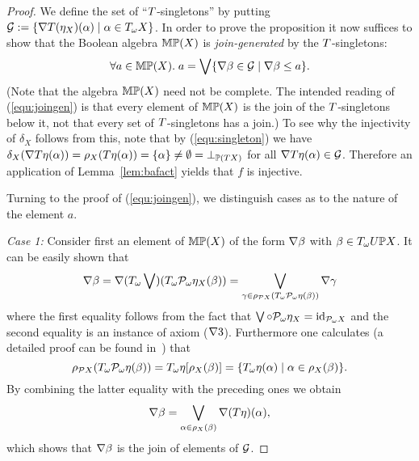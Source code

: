 \documentclass{book}
\begin{document}
\begin{proof}
We define the set of ``$T$-singletons'' by putting
$\mathcal{G} \mathrel{:=} \{ \nabla T(\eta_X)(\alpha)
\mid \alpha \in T_{\omega} X\}$.
In order to prove the proposition it now suffices to show that the Boolean 
algebra $\mathbb{M}\mathbb{P}(X)$ is \emph{join-generated} by the $T$-singletons: 
\begin{equation}
\label{equ:joingen}
\forall a \in \mathbb{M}\mathbb{P}(X). 
\; a = \bigvee \{\nabla \beta \in \mathcal{G} \mid \nabla \beta \leq a\}.
\end{equation}
(Note that the algebra $\mathbb{M}\mathbb{P}(X)$ need not be complete.  The intended
reading of (\ref{equ:joingen}) is that every element of $\mathbb{M}\mathbb{P}(X)$ is
the join of the $T$-singletons below it, not that every set of
$T$-singletons has a join.)  To see why the injectivity of
$\delta_{X}$ follows from this, note that by (\ref{equ:singleton}) we
have $\delta_X(\nabla T\eta(\alpha)) =
\rho_X(T\eta(\alpha)) = \{ \alpha \} \not = \emptyset =
\bot_{\mathbb{P}(T X)}$ for all $\nabla T\eta(\alpha)\in \mathcal{G}$.
Therefore an application of Lemma~\ref{lem:bafact} yields that $f$ is 
injective.

\noindent
Turning to the proof of (\ref{equ:joingen}), we distinguish cases as to the 
nature of the element $a$.

{\em Case 1:} Consider first an element of $\mathbb{M} \mathbb{P}(X)$ of the form
$\nabla \beta$ with $\beta \in T_{\omega} U \mathbb{P} X$. 
It can be easily shown that
    \[ \nabla \beta = \nabla (T_{\omega} \bigvee)(T_{\omega} \mathcal{P}_{\omega} 
    \eta_X (\beta))
    = \bigvee_{\gamma \in 
    \rho_{\mathcal{P} X}(T_{\omega} \mathcal{P}_{\omega} \eta (\beta))} 
    \nabla \gamma \]
    where the first equality follows from 
    the fact that $\bigvee {\circ} \mathcal{P}_{\omega} \eta_X = {\mathrm{id}}_{\mathcal{P}_{\omega} X}$
    and the second equality is an instance of 
    axiom ($\nabla 3$). 
    Furthermore one calculates (a detailed proof can be found 
    in~\cite{jaco04:trace}) that
    \[ \rho_{\mathcal{P} X}(T_{\omega} \mathcal{P}_{\omega} \eta (\beta)) = T_{\omega}\eta [ 
    \rho_X (\beta) ] = \{ T_{\omega}\eta(\alpha) \mid 
    \alpha \in \rho_X(\beta)  
    \}. \]
    By combining the latter equality with the
	preceding ones we obtain
	\[ \nabla \beta = \bigvee_{\alpha \in \rho_X(\beta)} 
	\nabla (T \eta)(\alpha) ,\]
	which shows that $\nabla \beta$ is the join of elements of $\mathcal{G}$. 


\end{proof}
\end{document}
